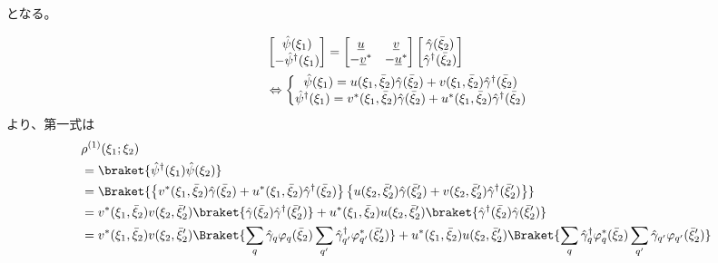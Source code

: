 \documentclass[dvipdfmx, 11pt, a4paper]{jsarticle}
\numberwithin{equation}{section}
\theoremstyle{definition}
\begin{document}
    となる。
    \begin{derivationBox}
        \begin{align}
            &\left[
            \begin{matrix}
                \hat{\psi}(\xi_1)\\
                -\hat{\psi}^\dagger(\xi_1)
            \end{matrix}
            \right] = 
            \left[
            \begin{matrix}
                \underline{u}&\underline{v}\\
                -\underline{v}^*&-\underline{u}^*
            \end{matrix}
            \right]
            \left[
            \begin{matrix}
                \hat{\gamma}(\bar{\xi}_2)\\
                \hat{\gamma}^\dagger(\bar{\xi}_2)
            \end{matrix}
            \right] \notag \\
            &\Leftrightarrow \left\{
            \begin{matrix}
                \hat{\psi}(\xi_1) = u(\xi_1,\bar{\xi}_2)\hat{\gamma}(\bar{\xi}_2) + v(\xi_1,\bar{\xi}_2)\hat{\gamma}^\dagger(\bar{\xi}_2) \\
                \hat{\psi}^\dagger(\xi_1) = v^*(\xi_1,\bar{\xi}_2)\hat{\gamma}(\bar{\xi}_2) + u^*(\xi_1,\bar{\xi}_2)\hat{\gamma}^\dagger(\bar{\xi}_2)
            \end{matrix}
            \right.
        \end{align}
        より、第一式は
        \begin{align}
            &\rho^{(1)}(\xi_1;\xi_2) \notag \\
            &= \braket{\hat{\psi}^\dagger(\xi_1)\hat{\psi}(\xi_2)} \notag \\
            &= \Braket{\left\{ v^*(\xi_1,\bar{\xi}_2)\hat{\gamma}(\bar{\xi}_2) + u^*(\xi_1,\bar{\xi}_2)\hat{\gamma}^\dagger(\bar{\xi}_2) \right\} \left\{ u(\xi_2,\bar{\xi}_2')\hat{\gamma}(\bar{\xi}_2') + v(\xi_2,\bar{\xi}_2')\hat{\gamma}^\dagger(\bar{\xi}_2') \right\}} \notag \\
            &=v^*(\xi_1,\bar{\xi}_2) v(\xi_2,\bar{\xi}_2')\braket{\hat{\gamma}(\bar{\xi}_2)\hat{\gamma}^\dagger(\bar{\xi}_2')} + u^*(\xi_1,\bar{\xi}_2)u(\xi_2,\bar{\xi}_2')\braket{\hat{\gamma}^\dagger(\bar{\xi}_2)\hat{\gamma}(\bar{\xi}_2')} \notag \\
            &=v^*(\xi_1,\bar{\xi}_2) v(\xi_2,\bar{\xi}_2')\Braket{\sum_q \hat{\gamma}_q\varphi_q(\bar{\xi}_2)\sum_{q'}\hat{\gamma}^\dagger_{q'}\varphi_{q'}^*(\bar{\xi}_2')} + u^*(\xi_1,\bar{\xi}_2)u(\xi_2,\bar{\xi}_2')\Braket{\sum_q\hat{\gamma}^\dagger_q \varphi_q^*(\bar{\xi}_2)\sum_{q'}\hat{\gamma}_{q'}\varphi_{q'}(\bar{\xi}_2')} \notag \\

\end{align}
\end{derivationBox}
\end{document}
